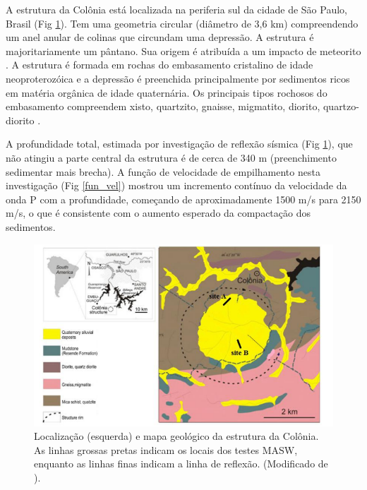 \documentclass[smallextended]{svjour3}       %
\begin{document}
A estrutura da Colônia está localizada na periferia sul da cidade de São Paulo, Brasil (Fig \ref{geologia}). Tem uma geometria circular (diâmetro de 3,6 km) compreendendo um anel anular de colinas que circundam uma depressão. A estrutura é majoritariamente um pântano. Sua origem é atribuída a um impacto de meteorito \citep{riccomini1989colonia}. A estrutura é formada em rochas do embasamento cristalino de idade neoproterozóica e a depressão é preenchida principalmente por sedimentos ricos em matéria orgânica de idade quaternária. Os principais tipos rochosos do embasamento compreendem xisto, quartzito, gnaisse, migmatito, diorito, quartzo-diorito \citep{sadowski1974tectonica}.

A profundidade total, estimada por investigação de reflexão sísmica (Fig \ref{geologia}), que não atingiu a parte central da estrutura \citep{riccomini2011colonia} é de cerca de 340 m (preenchimento sedimentar mais brecha). A função de velocidade de empilhamento nesta investigação (Fig \ref{fun_vel}) mostrou um incremento contínuo da velocidade da onda P com a profundidade, começando de aproximadamente 1500 m/s para 2150 m/s, o que é consistente com o aumento esperado da compactação dos sedimentos.

\begin{figure}[!hbtp]
  \begin{center}
  
  \includegraphics[scale=0.8]{Figures/fig1.png}
  \end{center}
  \caption{Localização (esquerda) e mapa geológico da estrutura da Colônia. As linhas grossas pretas indicam os locais dos testes MASW, enquanto as linhas finas indicam a linha de reflexão. (Modificado de \citealp{riccomini2011colonia}).
  }
  \label{geologia}
\end{figure}
\end{document}
